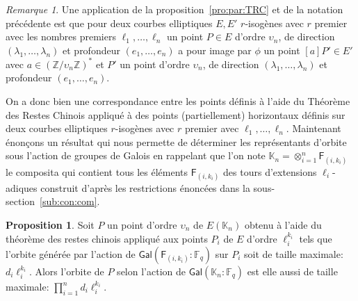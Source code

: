 \documentclass[10pt,a4paper]{book}
\theoremstyle{plain}
\theoremstyle{definition}
\theoremstyle{definition}
\theoremstyle{definition}
\newtheorem{prop}[thm]{Proposition}
\theoremstyle{definition}
\theoremstyle{remark}
\newtheorem{rem}[thm]{Remarque}
\theoremstyle{remark}
\theoremstyle{definition}
\begin{document}
\begin{rem}
Une application de la proposition~\ref{pro:par:TRC} et de la notation 
précédente est que pour deux courbes elliptiques $E,E'$ $r$-isogènes avec $r$ 
premier avec les nombres premiers $\ell_1, \dots, \ell_n$ un point $P \in E$ 
d'ordre $\upsilon_n$, de direction $(\lambda_1, \dots, \lambda_n)$ et 
profondeur $(e_1, \dots, e_n)$ a pour image par $\phi$ un point $[a]P' \in E'$
avec $a \in (\mathbb{Z}/\upsilon_n \mathbb{Z})^*$ et $P'$ un 
point d'ordre $\upsilon_n$, de direction $(\lambda_1, \dots, \lambda_n)$ et 
profondeur $(e_1, \dots, e_n)$.
\end{rem}
On a donc bien une correspondance entre les points définis à l'aide du Théorème
 des Restes Chinois appliqué à des points (partiellement) horizontaux définis 
 sur deux courbes elliptiques $r$-isogènes avec $r$ premier avec $\ell_1, \dots
 , \ell_n$.
 Maintenant énonçons un résultat qui nous permette de déterminer les 
 représentants d'orbite sous l'action de groupes de Galois en rappelant que 
 l'on note $\mathbb{K}_n=\otimes_{i=1}^{n}\mathsf{F}_{(i,k_i)}$ le composita 
 qui contient tous les éléments $\mathsf{F}_{(i,k_i)}$ des tours d'extensions
 $\ell_i$-adiques construit d'après les restrictions énoncées dans la 
 sous-section~\ref{sub:con:com}.
\begin{prop}
\label{pro:rep:com}
Soit $P$ un point d'ordre $\upsilon_n$ de $E(\mathbb{K}_n)$ obtenu à l'aide 
du théorème des restes chinois appliqué aux points $P_i$ de $E$ d'ordre 
$\ell_i^{k_i}$ tels que l'orbite générée par l'action de 
$\mathsf{Gal}(\mathsf{F}_{(i,k_i)}:\mathbb{F}_q)$ sur $P_i$ soit de taille
 maximale: $d_i\ell_i^{k_i}$.  Alors l'orbite de $P$ selon l'action de 
 $\mathsf{Gal}(\mathbb{K}_n:\mathbb{F}_q)$ est elle aussi de taille maximale:
 $\prod_{i=1}^nd_i\ell_i^{k_i}$.
\end{prop} 
\end{document}
